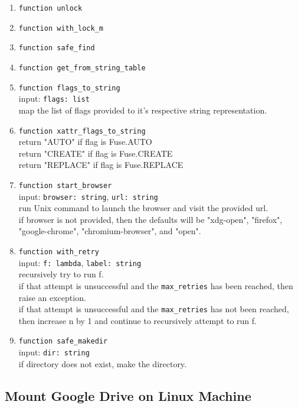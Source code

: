\begin{enumerate}
    \item \verb|function unlock| \\
    \item \verb|function with_lock_m| \\
    \item \verb|function safe_find| \\
    \item \verb|function get_from_string_table| \\
    \item \verb|function flags_to_string| \\
    input: \verb|flags: list| \\
    map the list of flags provided to it's respective string representation.
    \item \verb|function xattr_flags_to_string| \\
    return "AUTO" if flag is Fuse.AUTO \\
    return "CREATE" if flag is Fuse.CREATE \\
    return "REPLACE" if flag is Fuse.REPLACE \\
    \item \verb|function start_browser| \\
    input: \verb|browser: string|, \verb|url: string| \\
    run Unix command to launch the browser and visit the provided url. \\
    if browser is not provided, then the defaults will be "xdg-open", "firefox", "google-chrome", "chromium-browser", and "open". \\
    \item \verb|function with_retry| \\
    input: \verb|f: lambda|, \verb|label: string| \\
    recursively try to run f. \\
    if that attempt is unsuccessful and the \verb|max_retries| has been reached, then raise an exception. \\
    if that attempt is unsuccessful and the \verb|max_retries| has not been reached, then increase n by 1 and continue to recursively attempt to run f.
    \item \verb|function safe_makedir| \\
    input: \verb|dir: string| \\
    if directory does not exist, make the directory.
\end{enumerate}
\subsection{Mount Google Drive on Linux Machine}
